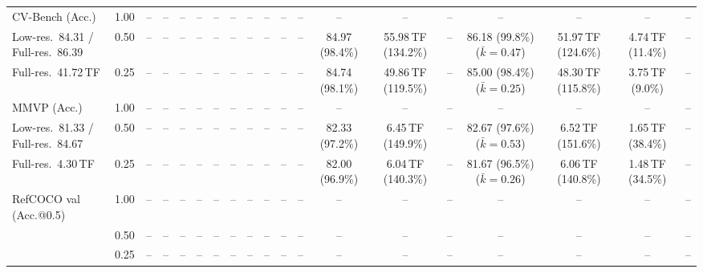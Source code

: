\begin{table}[t]
{\begin{tabular}{l c | c c c c | c c c c | c c | c c c | c c c c}
\cmidrule(lr){1-19}
CV-Bench (Acc.) & 1.00 & -- & -- & -- & -- & -- & -- & -- & -- & -- & -- & -- & -- & -- & -- & -- & -- & -- \\
{\footnotesize Low-res.\ 84.31 / Full-res.\ 86.39} & 0.50 & -- & -- & -- & -- & -- & -- & -- & -- & -- & -- & \cellcolor{gray!15}84.97 (98.4\%) & 55.98\,TF (134.2\%) & -- & \cellcolor{gray!15}86.18 (99.8\%) {\footnotesize ($\bar k{=}0.47$)} & 51.97\,TF (124.6\%) & 4.74\,TF (11.4\%) & -- \\
{\footnotesize Full-res.\ 41.72\,TF} & 0.25 & -- & -- & -- & -- & -- & -- & -- & -- & -- & -- & \cellcolor{gray!15}84.74 (98.1\%) & 49.86\,TF (119.5\%) & -- & \cellcolor{gray!15}85.00 (98.4\%) {\footnotesize ($\bar k{=}0.25$)} & 48.30\,TF (115.8\%) & 3.75\,TF (9.0\%) & -- \\
\cmidrule(lr){1-19}
MMVP (Acc.) & 1.00 & -- & -- & -- & -- & -- & -- & -- & -- & -- & -- & -- & -- & -- & -- & -- & -- & -- \\
{\footnotesize Low-res.\ 81.33 / Full-res.\ 84.67} & 0.50 & -- & -- & -- & -- & -- & -- & -- & -- & -- & -- & 82.33 (97.2\%) & 6.45\,TF (149.9\%) & -- & 82.67 (97.6\%) {\footnotesize ($\bar k{=}0.53$)} & 6.52\,TF (151.6\%) & 1.65\,TF (38.4\%) & -- \\
{\footnotesize Full-res.\ 4.30\,TF} & 0.25 & -- & -- & -- & -- & -- & -- & -- & -- & -- & -- & 82.00 (96.9\%) & 6.04\,TF (140.3\%) & -- & 81.67 (96.5\%) {\footnotesize ($\bar k{=}0.26$)} & 6.06\,TF (140.8\%) & 1.48\,TF (34.5\%) & -- \\
\cmidrule(lr){1-19}
RefCOCO val (Acc.@0.5) & 1.00 & -- & -- & -- & -- & -- & -- & -- & -- & -- & -- & -- & -- & -- & -- & -- & -- & -- \\
 & 0.50 & -- & -- & -- & -- & -- & -- & -- & -- & -- & -- & -- & -- & -- & -- & -- & -- & -- \\
 & 0.25 & -- & -- & -- & -- & -- & -- & -- & -- & -- & -- & -- & -- & -- & -- & -- & -- & -- \\
\bottomrule
\end{tabular}}
\end{table}
